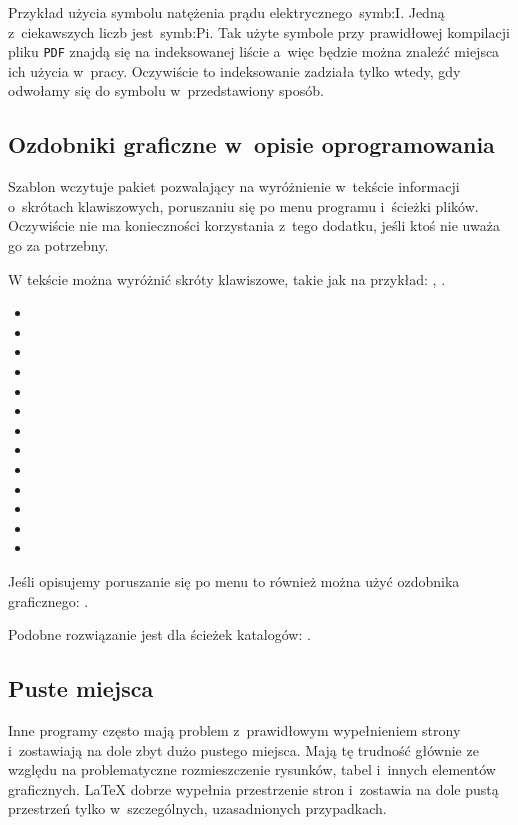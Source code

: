 Przykład użycia symbolu natężenia prądu elektrycznego~\gls{symb:I}. Jedną z~ciekawszych liczb jest~\gls{symb:Pi}. Tak użyte symbole przy prawidłowej kompilacji pliku \texttt{PDF} znajdą się na indeksowanej liście a~więc będzie można znaleźć miejsca ich użycia w~pracy. Oczywiście to indeksowanie zadziała tylko wtedy, gdy odwołamy się do symbolu w~przedstawiony sposób.

\subsection{Ozdobniki graficzne w~opisie oprogramowania}
Szablon wczytuje pakiet pozwalający na wyróżnienie w~tekście informacji o~skrótach klawiszowych, poruszaniu się po menu programu i~ścieżki plików. Oczywiście nie ma konieczności korzystania z~tego dodatku, jeśli ktoś nie uważa go za potrzebny.

W tekście można wyróżnić skróty klawiszowe, takie jak na przykład: , \keys{\ctrl, \Alt, \del}.
\begin{itemize}
    \item {}
    \item \keys{\Space} \keys{\SPACE}
    \item \keys{\backspace} \keys{\del} \keys{\backdel}
    \item \keys{\return} \keys{\enter}
    \item \keys{\shift} \keys{\capslock}
    \item \keys{\ctrl} \keys{\Alt} \keys{\AltGr}
    \item \keys{\tab}
    \item \keys{\esc} \keys{\oldesc}
    \item \keys{\winmenu}
    \item \keys{\arrowkey{^}} \keys{\arrowkeyup}
    \item {} \keys{\arrowkeydown}
    \item \keys{\arrowkey{>}} \keys{\arrowkeyright}
    \item \keys{\arrowkey{<}} \keys{\arrowkeyleft}
\end{itemize}

Jeśli opisujemy poruszanie się po menu to również można użyć ozdobnika graficznego: .

Podobne rozwiązanie jest dla ścieżek katalogów: .

\subsection{Puste miejsca}
Inne programy często mają problem z~prawidłowym wypełnieniem strony i~zostawiają na dole zbyt dużo pustego miejsca. Mają tę trudność głównie ze względu na problematyczne rozmieszczenie rysunków, tabel i~innych elementów graficznych. \LaTeX{} dobrze wypełnia przestrzenie stron i~zostawia na dole pustą przestrzeń tylko w~szczególnych, uzasadnionych przypadkach.

